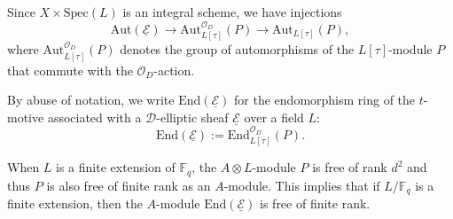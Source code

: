 \documentclass[10pt]{amsart}
\theoremstyle{plain}
\theoremstyle{definition}
\newcommand{\Aut}{\mathrm{Aut}}
\newcommand{\End}{\mathrm{End}}
\newcommand{\Spec}{\mathrm{Spec}}
\newcommand{\cO}{\mathcal{O}}
\newcommand{\ucE}{\underline{\mathcal{E}}}
\newcommand{\bF}{\mathbb{F}}
\newcommand{\sD}{\mathscr{D}}
\begin{document}
Since $X\times\Spec(L)$ is an integral scheme, we have injections
\begin{equation}\label{EqnAutP}
\Aut(\ucE)\to \Aut_{L[\tau]}^{\cO_D}(P)\to \Aut_{L[\tau]}(P),
\end{equation}
where $\Aut_{L[\tau]}^{\cO_D}(P)$ denotes the group of automorphisms of the $L[\tau]$-module $P$ that commute with the $\cO_D$-action.

By abuse of notation, we write $\End(\ucE)$ for the endomorphism ring of the $t$-motive associated with a $\sD$-elliptic sheaf $\ucE$ over a field $L$:
\begin{equation}\label{EqnIdentifyEndP}
	\End(\ucE):=\End_{L[\tau]}^{\cO_D}(P).
\end{equation}

When $L$ is a finite extension of $\bF_q$, the $A\otimes L$-module $P$ is free of rank $d^2$ and thus $P$ is also free of finite rank as an $A$-module.
This implies that if $L/\bF_q$ is a finite extension, then the $A$-module $\End(\ucE)$ is free of finite rank. 
\end{document}
